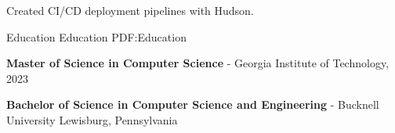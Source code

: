 \documentclass[MMMMyyyy,nonstopmode]{simpleresumecv_stacked}
\newif\ifLOCATION
\newif\ifNOTSELECTED
\begin{document}
\begin{Body}
\begin{Detail}
	Created CI/CD deployment pipelines with Hudson.
\end{Detail}
\fi %


\ifNOTSELECTED
\begin{Detail}
Created applications to build DSL circuits and track sales commissions in Java and SQL.
\end{Detail}
\fi %

\ifNOTSELECTED
\Gap
\Entry
\textbf{Senior Software Engineer}, Global Crossing/Level3

\begin{Detail}
Led multi-site teams to create telecom applications in Java and SQL.
\end{Detail}
\fi %

\ifNOTSELECTED
\begin{Detail}
Created trading systems for equity derivatives and HFT trading desks in C, C++, and Excel.
\end{Detail}
\fi %

\ifNOTSELECTED
\begin{Detail}
Developed systems for MBS mortgage, Treasury, and Repo trading desks in C and C++.
\end{Detail}
\fi %
\fi %
%

\Section
{Education}
{Education}
{PDF:Education}

\Entry
\textbf{Master of Science in Computer Science} -
Georgia Institute of Technology, 2023 %

\ifNOTSELECTED %
\BulletItem
Coursework: Compiler Optimization, CPU Architecture, LLVM Software Analysis, Applied ML and AI
\fi %

\iftrue %

\Entry
\textbf{Bachelor of Science in Computer Science and Engineering} - 
Bucknell University
\ifLOCATION
\hfill Lewisburg, Pennsylvania
\fi


\end{Body}
\end{document}
